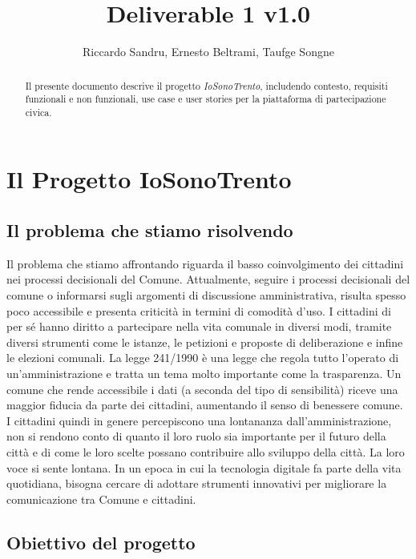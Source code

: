 \documentclass{article}
\title{Deliverable 1 v1.0}
\author{Riccardo Sandru, Ernesto Beltrami, Taufge Songne}
\begin{document}
\maketitle

\begin{abstract}
	Il presente documento descrive il progetto \textit{IoSonoTrento}, includendo contesto, requisiti funzionali e non funzionali, use case e user stories per la piattaforma di partecipazione civica.
\end{abstract}

\setcounter{tocdepth}{2}  %
\setcounter{secnumdepth}{3}  %
\tableofcontents
\newpage

\section{Il Progetto IoSonoTrento}

\subsection{Il problema che stiamo risolvendo}

Il problema che stiamo affrontando riguarda il basso coinvolgimento dei cittadini nei processi decisionali del Comune.
Attualmente, seguire i processi decisionali del comune o informarsi sugli argomenti di discussione amministrativa, risulta spesso poco accessibile e presenta criticità  in termini di comodità d'uso.
I cittadini di per sé hanno diritto a partecipare nella vita comunale in diversi modi, tramite diversi strumenti come le istanze, le petizioni e proposte di deliberazione e infine le elezioni comunali. 
La legge 241/1990 è una legge che regola tutto l’operato di un'amministrazione e tratta un tema molto importante come la trasparenza. Un comune che rende accessibile i dati (a seconda del tipo di sensibilità) riceve una maggior fiducia da parte dei cittadini, aumentando il senso di benessere comune.
I cittadini quindi in genere percepiscono una lontananza dall’amministrazione, non si rendono conto di quanto il loro ruolo sia importante per il futuro della città e di come le loro scelte possano contribuire allo sviluppo della città. La loro voce si sente lontana.
In un epoca in cui la tecnologia digitale fa parte della vita quotidiana, bisogna cercare di  adottare strumenti innovativi per migliorare la comunicazione tra Comune e cittadini.

\subsection{Obiettivo del progetto}
\end{document}
